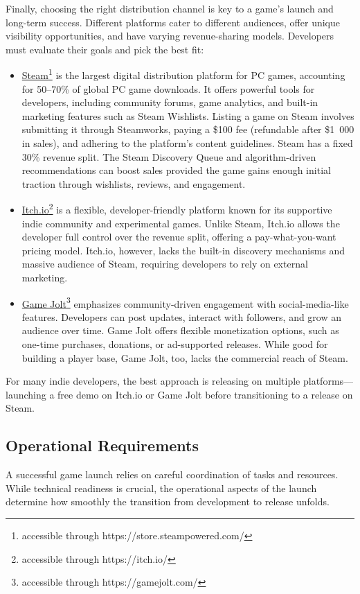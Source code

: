 Finally, choosing the right distribution channel is key to a game’s launch and long-term success. Different platforms cater to different audiences, offer unique visibility opportunities, and have varying revenue-sharing models. Developers must evaluate their goals and pick the best fit:
\begin{itemize}
	\item \href{https://store.steampowered.com/}{Steam}\footnote{accessible through https://store.steampowered.com/} is the largest digital distribution platform for PC games, accounting for 50--70\% of global PC game downloads. It offers powerful tools for developers, including community forums, game analytics, and built-in marketing features such as Steam Wishlists. Listing a game on Steam involves submitting it through Steamworks, paying a \$100 fee (refundable after \$1~000 in sales), and adhering to the platform’s content guidelines. Steam has a fixed 30\% revenue split. The Steam Discovery Queue and algorithm-driven recommendations can boost sales provided the game gains enough initial traction through wishlists, reviews, and engagement. \cite{steam_wishlist,steam_partner-program,steam_discovery}
	\item \href{https://itch.io/}{Itch.io}\footnote{accessible through https://itch.io/} is a flexible, developer-friendly platform known for its supportive indie community and experimental games. Unlike Steam, Itch.io allows the developer full control over the revenue split, offering a pay-what-you-want pricing model. Itch.io, however, lacks the built-in discovery mechanisms and massive audience of Steam, requiring developers to rely on external marketing. \cite{carpenter_creator-day}
	\item \href{https://gamejolt.com/}{Game Jolt}\footnote{accessible through https://gamejolt.com/} emphasizes community-driven engagement with social-media-like features. Developers can post updates, interact with followers, and grow an audience over time. Game Jolt offers flexible monetization options, such as one-time purchases, donations, or ad-supported releases. While good for building a player base, Game Jolt, too, lacks the commercial reach of Steam. \cite{game-jolt_help}
\end{itemize}
For many indie developers, the best approach is releasing on multiple platforms---launching a free demo on Itch.io or Game Jolt before transitioning to a release on Steam.

\subsection{Operational Requirements}
A successful game launch relies on careful coordination of tasks and resources. While technical readiness is crucial, the operational aspects of the launch determine how smoothly the transition from development to release unfolds.

